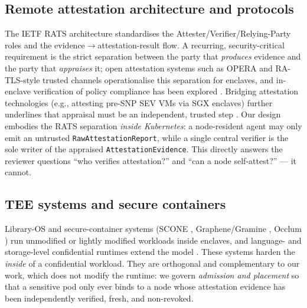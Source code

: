 \subsection{Remote attestation architecture and protocols}
The IETF RATS architecture \cite{birkholz2023rats} standardises the
Attester/Verifier/Relying-Party roles and the evidence$\rightarrow$attestation-result
flow. A recurring, security-critical requirement is the strict separation between
the party that \emph{produces} evidence and the party that \emph{appraises} it;
open attestation systems such as OPERA \cite{chen2019opera} and RA-TLS-style
trusted channels \cite{knauth2018ratls,akama2024raweb} operationalise this
separation for enclaves, and in-enclave verification of policy compliance has
been explored \cite{liu2020confidattest}. Bridging attestation technologies
(e.g., attesting pre-SNP SEV VMs via SGX enclaves) further underlines that
appraisal must be an independent, trusted step \cite{antonino2023flexattest}.
Our design embodies the RATS separation \emph{inside Kubernetes}: a
node-resident agent may only emit an untrusted \texttt{RawAttestationReport},
while a single central verifier is the sole writer of the appraised
\texttt{AttestationEvidence}. This directly answers the reviewer questions
``who verifies attestation?'' and ``can a node self-attest?'' --- it cannot.

\subsection{TEE systems and secure containers}
Library-OS and secure-container systems (SCONE \cite{arnautov2016scone},
Graphene/Gramine \cite{tsai2017graphene}, Occlum \cite{shen2020occlum}) run
unmodified or lightly modified workloads inside enclaves, and language- and
storage-level confidential runtimes extend the model
\cite{sarkar2024hastee,hartono2024crisp}. These systems harden the \emph{inside}
of a confidential workload. They are orthogonal and complementary to our work,
which does not modify the runtime: we govern \emph{admission and placement} so
that a sensitive pod only ever binds to a node whose attestation evidence has
been independently verified, fresh, and non-revoked.

